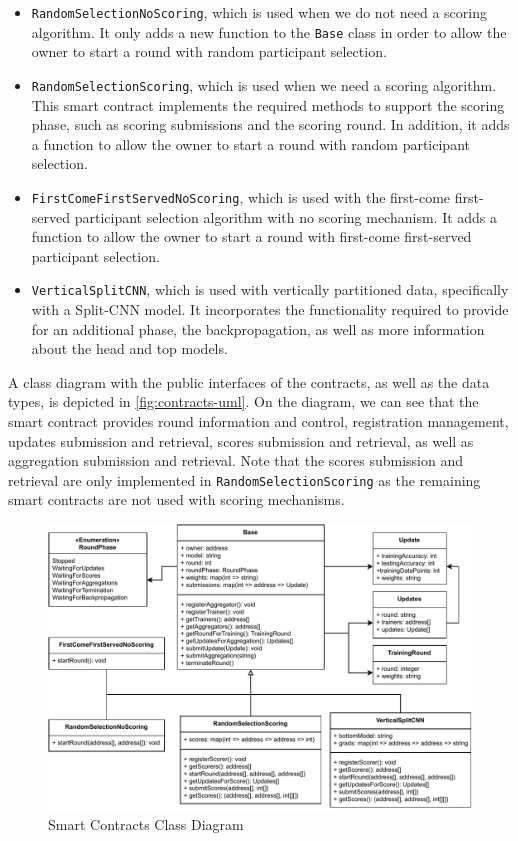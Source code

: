 \begin{itemize}
    \item \texttt{RandomSelectionNoScoring}, which is used when we do not need a scoring algorithm. It only adds a new function to the \texttt{Base} class in order to allow the owner to start a round with random participant selection.
    
    \item \texttt{RandomSelectionScoring}, which is used when we need a scoring algorithm. This smart contract implements the required methods to support the scoring phase, such as scoring submissions and the scoring round. In addition, it adds a function to allow the owner to start a round with random participant selection.
    
    \item \texttt{FirstComeFirstServedNoScoring}, which is used with the first-come first-served participant selection algorithm with no scoring mechanism. It adds a function to allow the owner to start a round with first-come first-served participant selection.
    
    \item \texttt{VerticalSplitCNN}, which is used with vertically partitioned data, specifically with a Split-CNN model. It incorporates the functionality required to provide for an additional phase, the backpropagation, as well as more information about the head and top models.
\end{itemize}

A class diagram with the public interfaces of the contracts, as well as the data types, is depicted in \autoref{fig:contracts-uml}. On the diagram, we can see that the smart contract provides round information and control, registration management, updates submission and retrieval, scores submission and retrieval, as well as aggregation submission and retrieval. Note that the scores submission and retrieval are only implemented in \texttt{RandomSelectionScoring} as the remaining smart contracts are not used with scoring mechanisms.

\begin{figure}[!ht]
    \centering
    \centering
    \includegraphics[width=1\textwidth]{graphics/smart-contract-uml.pdf}
    \caption{Smart Contracts Class Diagram}
    \label{fig:contracts-uml}
\end{figure}

